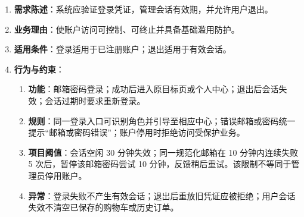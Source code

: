 \begin{enumerate}
\item {\bfseries 需求陈述}：系统应验证登录凭证，管理会话有效期，并允许用户退出。
\item {\bfseries 业务理由}：使账户访问可控制、可终止并具备基础滥用防护。
\item {\bfseries 适用条件}：登录适用于已注册账户；退出适用于有效会话。
\item {\bfseries 行为与约束}：
\begin{enumerate}
\item {\bfseries 功能}：邮箱密码登录；成功后进入原目标页或个人中心；退出后会话失效；会话过期时要求重新登录。
\item {\bfseries 规则}：同一登录入口可识别角色并引导至相应中心；错误邮箱或密码统一提示“邮箱或密码错误”；账户停用时拒绝访问受保护业务。
\item {\bfseries 项目阈值}：会话空闲 30 分钟失效；同一规范化邮箱在 10 分钟内连续失败 5 次后，暂停该邮箱密码尝试 10 分钟，反馈稍后重试。该限制不等同于管理员停用账户。
\item {\bfseries 异常}：登录失败不产生有效会话；退出后重放旧凭证应被拒绝；用户会话失效不清空已保存的购物车或历史订单。
\end{enumerate}

\end{enumerate}


